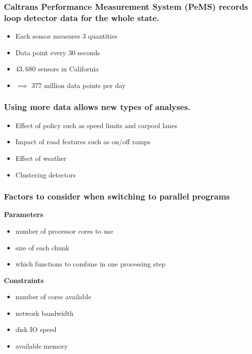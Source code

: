 \documentclass{beamer}
\begin{document}
\begin{frame}


\frametitle{Caltrans Performance Measurement System (PeMS) records loop
    detector data for the whole state.}

    \begin{itemize}
        \item Each sensor measures 3 quantities
        \item Data point every 30 seconds
        \item $43,680$ sensors in California
        \item $\implies$  377 million data points per day
    \end{itemize}

\end{frame}
\begin{frame}

    \frametitle{Using more data allows new types of analyses.}


    \begin{itemize}
        \item Effect of policy such as speed limits and carpool lanes
        \item Impact of road features such as on/off ramps
        \item Effect of weather
        \item Clustering detectors
    \end{itemize}


\end{frame}
\begin{frame}

    \frametitle{Factors to consider when switching to parallel programs}


\textbf{Parameters}
\begin{itemize}
    \item number of processor cores to use
    \item size of each chunk
    \item which functions to combine in one processing step
\end{itemize}

\textbf{Constraints}
\begin{itemize}
    \item number of cores available
    \item network bandwidth
    \item disk IO speed
    \item available memory
\end{itemize}

\end{frame}
\end{document}
